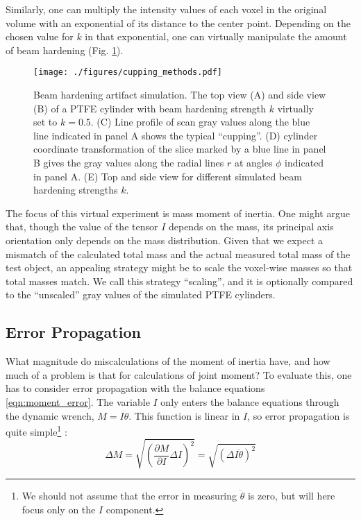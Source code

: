 Similarly, one can multiply the intensity values of each voxel in the original volume with an exponential of its distance to the center point.
Depending on the chosen value for \(k\) in that exponential, one can virtually manipulate the amount of beam hardening (Fig. \ref{fig:cupping_methods}).


\begin{figure}[htbp]
\centering
\texttt{[image: ./figures/cupping\_methods.pdf]}
\caption{\label{fig:cupping_methods}Beam hardening artifact simulation. The top view (A) and side view (B) of a PTFE cylinder with beam hardening strength \(k\) virtually set to \(k=0.5\). (C) Line profile of scan gray values along the blue line indicated in panel A shows the typical ``cupping''. (D) cylinder coordinate transformation of the slice marked by a blue line in panel B gives the gray values along the radial lines \(r\) at angles \(\phi\) indicated in panel A. (E) Top and side view for different simulated beam hardening strengths \(k\).}
\end{figure}


The focus of this virtual experiment is mass moment of inertia.
One might argue that, though the value of the tensor \(I\) depends on the mass, its principal axis orientation only depends on the mass distribution.
Given that we expect a mismatch of the calculated total mass and the actual measured total mass of the test object, an appealing strategy might be to scale the voxel-wise masses so that total masses match.
We call this strategy ``scaling'', and it is optionally compared to the ``unscaled'' gray values of the simulated PTFE cylinders.



\subsection{Error Propagation}
\label{sec:org4bf8fa7}
What magnitude do miscalculations of the moment of inertia have, and how much of a problem is that for calculations of joint moment?
To evaluate this, one has to consider error propagation \citep{Hughes2010,Arroyave2022,Myers2015} with the balance equations \eqref{eqn:moment_error}.
The variable \(I\) only enters the balance equations through the dynamic wrench, \(M = I \ddot\theta\).
This function is linear in \(I\), so error propagation is quite simple\footnote{We should not assume that the error in measuring \(\ddot \theta\) is zero, but will here focus only on the \(I\) component.} \citep{Normann2016}:
\begin{equation}\label{eqn:moment_error}
\Delta M = \sqrt{\left(\frac{\partial M}{\partial I}\Delta I\right)^2} = \sqrt{\left(\Delta I \ddot\theta\right)^2}
\end{equation}

